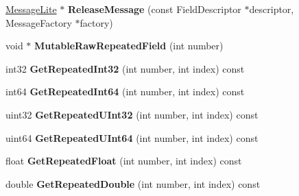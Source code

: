 \begin{DoxyCompactItemize}
\hyperlink{classgoogle_1_1protobuf_1_1MessageLite}{Message\+Lite} $\ast$ {\bfseries Release\+Message} (const Field\+Descriptor $\ast$descriptor, Message\+Factory $\ast$factory)
\item 
\mbox{\label{classgoogle_1_1protobuf_1_1internal_1_1ExtensionSet_ac1ce41992339141b4d4eb8975b2df896}} 
void $\ast$ {\bfseries Mutable\+Raw\+Repeated\+Field} (int number)
\item 
\mbox{\label{classgoogle_1_1protobuf_1_1internal_1_1ExtensionSet_a77b13d7c6b9c07b9e8da2dc2058fe013}} 
int32 {\bfseries Get\+Repeated\+Int32} (int number, int index) const
\item 
\mbox{\label{classgoogle_1_1protobuf_1_1internal_1_1ExtensionSet_a43de149caa76373e657f5df098c609af}} 
int64 {\bfseries Get\+Repeated\+Int64} (int number, int index) const
\item 
\mbox{\label{classgoogle_1_1protobuf_1_1internal_1_1ExtensionSet_a2f2484da76b758bf56ab27bc0049cfcb}} 
uint32 {\bfseries Get\+Repeated\+U\+Int32} (int number, int index) const
\item 
\mbox{\label{classgoogle_1_1protobuf_1_1internal_1_1ExtensionSet_ab171237097e5197790cd17dba135019b}} 
uint64 {\bfseries Get\+Repeated\+U\+Int64} (int number, int index) const
\item 
\mbox{\label{classgoogle_1_1protobuf_1_1internal_1_1ExtensionSet_af1a26c024507e81f9654eda220873a9e}} 
float {\bfseries Get\+Repeated\+Float} (int number, int index) const
\item 
\mbox{\label{classgoogle_1_1protobuf_1_1internal_1_1ExtensionSet_a313d75df3a4ed826debfcd4544aee493}} 
double {\bfseries Get\+Repeated\+Double} (int number, int index) const
\item 
\mbox{\label{classgoogle_1_1protobuf_1_1internal_1_1ExtensionSet_af7f102acde6c05eb545982105fe5069c}} 

\end{DoxyCompactItemize}
